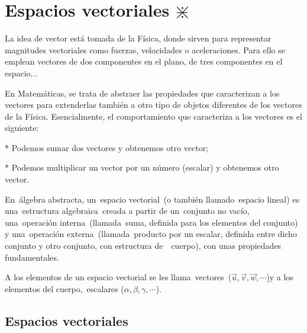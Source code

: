 
\chapter{Espacios vectoriales $\divideontimes$}	\label{e_vec}

La idea de vector está tomada de la Física, donde sirven para representar magnitudes vectoriales como fuerzas, velocidades o aceleraciones. Para ello se emplean vectores de dos componentes en el plano, de tres componentes en el espacio... 

En Matemáticas, se trata de abstraer las propiedades que caracterizan a los vectores para extenderlas también a otro tipo de objetos diferentes de los vectores de la Física. Esencialmente, el comportamiento que caracteriza a los vectores es el siguiente: 

\hspace{3mm} * Podemos sumar dos vectores y obtenemos otro vector; 

\hspace{3mm} * Podemos multiplicar un vector por un número (escalar) y obtenemos otro vector. 

En álgebra abstracta, un espacio vectorial (o también llamado espacio lineal) es una estructura algebraica creada a partir de un conjunto no vacío, una operación interna (llamada suma, definida para los elementos del conjunto) y una operación externa (llamada producto por un escalar, definida entre dicho conjunto y otro conjunto, con estructura de  cuerpo), con unas propiedades fundamentales.

A los elementos de un espacio vectorial se les llama vectores ($\vec u, \vec v, \vec w, \cdots  $)y a los elementos del cuerpo, escalares ($\alpha, \beta, \gamma, \cdots$).

\section{Espacios vectoriales}

